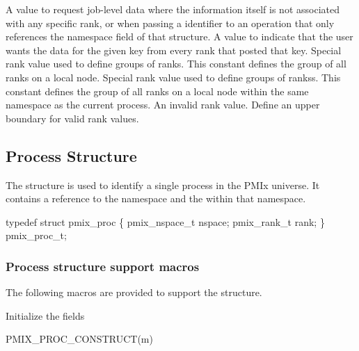 \begin{constantdesc}
%
A value to request job-level data where the information itself is not associated with any specific rank, or when passing a  identifier to an operation that only references the namespace field of that structure.
%
A value to indicate that the user wants the data for the given key from every rank that posted that key.
%
Special rank value used to define groups of ranks.
This constant defines the group of all ranks on a local node.
%
Special rank value used to define groups of rankss.
This constant defines the group of all ranks on a local node within the same namespace as the current process.
%
An invalid rank value.
%
Define an upper boundary for valid rank values.
%
\end{constantdesc}


\subsection{Process Structure}

The  structure is used to identify a single process in the PMIx universe.
It contains a reference to the namespace and the  within that namespace.

\cspecificstart
\begin{codepar}
typedef struct pmix_proc \{
    pmix_nspace_t nspace;
    pmix_rank_t rank;
\} pmix_proc_t;
\end{codepar}
\cspecificend

\subsubsection{Process structure support macros}
The following macros are provided to support the  structure.


Initialize the  fields

\cspecificstart
\begin{codepar}
PMIX_PROC_CONSTRUCT(m)
\end{codepar}
\cspecificend

